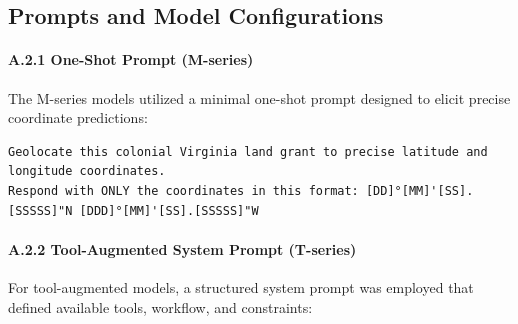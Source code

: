 \subsection{Prompts and Model Configurations}\label{sec:prompts}

\paragraph{A.2.1 One-Shot Prompt
(M-series)}\label{a.2.1-one-shot-prompt-m-series}

The M-series models utilized a minimal one-shot prompt designed to
elicit precise coordinate predictions:

\begin{lstlisting}
Geolocate this colonial Virginia land grant to precise latitude and longitude coordinates.
Respond with ONLY the coordinates in this format: [DD]°[MM]'[SS].[SSSSS]"N [DDD]°[MM]'[SS].[SSSSS]"W
\end{lstlisting}

\paragraph{A.2.2 Tool-Augmented System Prompt
(T-series)}\label{a.2.2-tool-augmented-system-prompt-t-series}

For tool-augmented models, a structured system prompt was employed that
defined available tools, workflow, and constraints:

